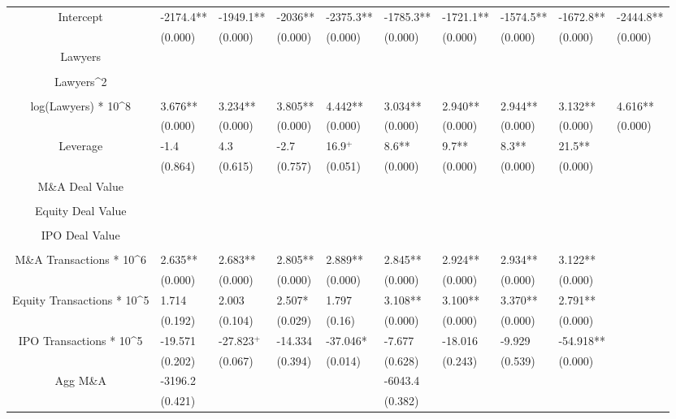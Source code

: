\documentclass{article}
\begin{document}
\begin{table}[H]
\begin{tabular}{|clllllllll|}
Intercept & -2174.4** & -1949.1** & -2036** & -2375.3** & -1785.3** & -1721.1** & -1574.5** & -1672.8** & -2444.8** \\ 
   & (0.000) & (0.000) & (0.000) & (0.000) & (0.000) & (0.000) & (0.000) & (0.000) & (0.000) \\ 
  Lawyers &  &  &  &  &  &  &  &  &  \\ 
   &  &  &  &  &  &  &  &  &  \\ 
  Lawyers^2 &  &  &  &  &  &  &  &  &  \\ 
   &  &  &  &  &  &  &  &  &  \\ 
  log(Lawyers) * 10^8 & 3.676** & 3.234** & 3.805** & 4.442** & 3.034** & 2.940** & 2.944** & 3.132** & 4.616** \\ 
   & (0.000) & (0.000) & (0.000) & (0.000) & (0.000) & (0.000) & (0.000) & (0.000) & (0.000) \\ 
  Leverage & -1.4 & 4.3 & -2.7 & 16.9$^{+}$ & 8.6** & 9.7** & 8.3** & 21.5** &  \\ 
   & (0.864) & (0.615) & (0.757) & (0.051) & (0.000) & (0.000) & (0.000) & (0.000) &  \\ 
  M\&A Deal Value &  &  &  &  &  &  &  &  &  \\ 
   &  &  &  &  &  &  &  &  &  \\ 
  Equity Deal Value &  &  &  &  &  &  &  &  &  \\ 
   &  &  &  &  &  &  &  &  &  \\ 
  IPO Deal Value &  &  &  &  &  &  &  &  &  \\ 
   &  &  &  &  &  &  &  &  &  \\ 
  M\&A Transactions * 10^6 & 2.635** & 2.683** & 2.805** & 2.889** & 2.845** & 2.924** & 2.934** & 3.122** &  \\ 
   & (0.000) & (0.000) & (0.000) & (0.000) & (0.000) & (0.000) & (0.000) & (0.000) &  \\ 
  Equity Transactions * 10^5 & 1.714 & 2.003 & 2.507* & 1.797 & 3.108** & 3.100** & 3.370** & 2.791** &  \\ 
   & (0.192) & (0.104) & (0.029) & (0.16) & (0.000) & (0.000) & (0.000) & (0.000) &  \\ 
  IPO Transactions * 10^5 & -19.571 & -27.823$^{+}$ & -14.334 & -37.046* & -7.677 & -18.016 & -9.929 & -54.918** &  \\ 
   & (0.202) & (0.067) & (0.394) & (0.014) & (0.628) & (0.243) & (0.539) & (0.000) &  \\ 
  Agg M\&A & -3196.2 &  &  &  & -6043.4 &  &  &  &  \\ 
   & (0.421) &  &  &  & (0.382) &  &  &  &  \\ 

\end{tabular}
\end{table}
\end{document}
